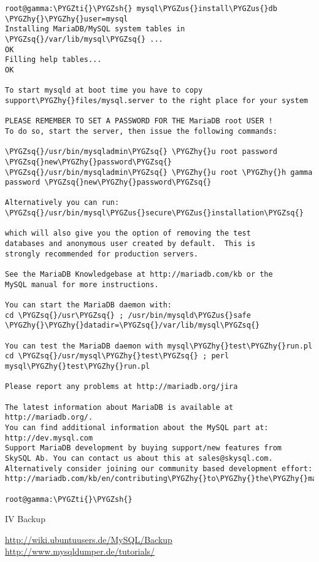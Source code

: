 \documentclass[letterpaper,10pt,english]{sphinxmanual}
\def\PYGZus{\char`\_}
\def\PYGZsh{\char`\#}
\def\PYGZhy{\char`\-}
\def\PYGZsq{\char`\'}
\def\PYGZti{\char`\~}
\begin{document}
\begin{Verbatim}[commandchars=\\\{\}]
root@gamma:\PYGZti{}\PYGZsh{} mysql\PYGZus{}install\PYGZus{}db \PYGZhy{}\PYGZhy{}user=mysql
Installing MariaDB/MySQL system tables in \PYGZsq{}/var/lib/mysql\PYGZsq{} ...
OK
Filling help tables...
OK

To start mysqld at boot time you have to copy
support\PYGZhy{}files/mysql.server to the right place for your system

PLEASE REMEMBER TO SET A PASSWORD FOR THE MariaDB root USER !
To do so, start the server, then issue the following commands:

\PYGZsq{}/usr/bin/mysqladmin\PYGZsq{} \PYGZhy{}u root password \PYGZsq{}new\PYGZhy{}password\PYGZsq{}
\PYGZsq{}/usr/bin/mysqladmin\PYGZsq{} \PYGZhy{}u root \PYGZhy{}h gamma password \PYGZsq{}new\PYGZhy{}password\PYGZsq{}

Alternatively you can run:
\PYGZsq{}/usr/bin/mysql\PYGZus{}secure\PYGZus{}installation\PYGZsq{}

which will also give you the option of removing the test
databases and anonymous user created by default.  This is
strongly recommended for production servers.

See the MariaDB Knowledgebase at http://mariadb.com/kb or the
MySQL manual for more instructions.

You can start the MariaDB daemon with:
cd \PYGZsq{}/usr\PYGZsq{} ; /usr/bin/mysqld\PYGZus{}safe \PYGZhy{}\PYGZhy{}datadir=\PYGZsq{}/var/lib/mysql\PYGZsq{}

You can test the MariaDB daemon with mysql\PYGZhy{}test\PYGZhy{}run.pl
cd \PYGZsq{}/usr/mysql\PYGZhy{}test\PYGZsq{} ; perl mysql\PYGZhy{}test\PYGZhy{}run.pl

Please report any problems at http://mariadb.org/jira

The latest information about MariaDB is available at http://mariadb.org/.
You can find additional information about the MySQL part at:
http://dev.mysql.com
Support MariaDB development by buying support/new features from
SkySQL Ab. You can contact us about this at sales@skysql.com.
Alternatively consider joining our community based development effort:
http://mariadb.com/kb/en/contributing\PYGZhy{}to\PYGZhy{}the\PYGZhy{}mariadb\PYGZhy{}project/

root@gamma:\PYGZti{}\PYGZsh{}
\end{Verbatim}

IV Backup

\href{http://wiki.ubuntuusers.de/MySQL/Backup}{http://wiki.ubuntuusers.de/MySQL/Backup}
\href{http://www.mysqldumper.de/tutorials/}{http://www.mysqldumper.de/tutorials/}
\end{document}
